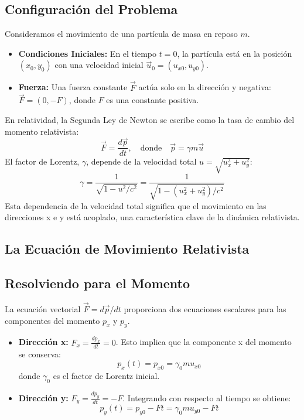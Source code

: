 \documentclass[11pt,a4paper]{article}
\begin{document}
\subsection{Configuración del Problema}
Consideramos el movimiento de una partícula de masa en reposo $m$.
\begin{itemize}
    \item \textbf{Condiciones Iniciales:} En el tiempo $t=0$, la partícula está en la posición $(x_0, y_0)$ con una velocidad inicial $\vec{u}_0 = (u_{x0}, u_{y0})$.
    \item \textbf{Fuerza:} Una fuerza constante $\vec{F}$ actúa solo en la dirección y negativa: $\vec{F} = (0, -F)$, donde $F$ es una constante positiva.
\end{itemize}
En relatividad, la Segunda Ley de Newton se escribe como la tasa de cambio del momento relativista:
\[ \vec{F} = \frac{d\vec{p}}{dt}, \quad \text{donde} \quad \vec{p} = \gamma m \vec{u} \]
El factor de Lorentz, $\gamma$, depende de la velocidad total $u = \sqrt{u_x^2 + u_y^2}$:
\[ \gamma = \frac{1}{\sqrt{1 - u^2/c^2}} = \frac{1}{\sqrt{1 - (u_x^2 + u_y^2)/c^2}} \]
Esta dependencia de la velocidad total significa que el movimiento en las direcciones x e y está acoplado, una característica clave de la dinámica relativista.

\subsection{La Ecuación de Movimiento Relativista}

\subsection{Resolviendo para el Momento}
La ecuación vectorial $\vec{F} = d\vec{p}/dt$ proporciona dos ecuaciones escalares para las componentes del momento $p_x$ y $p_y$.
\begin{itemize}
    \item \textbf{Dirección x:} $F_x = \frac{dp_x}{dt} = 0$. Esto implica que la componente x del momento se conserva:
    \[ p_x(t) = p_{x0} = \gamma_0 m u_{x0} \]
    donde $\gamma_0$ es el factor de Lorentz inicial.
    \item \textbf{Dirección y:} $F_y = \frac{dp_y}{dt} = -F$. Integrando con respecto al tiempo se obtiene:
    \[ p_y(t) = p_{y0} - Ft = \gamma_0 m u_{y0} - Ft \]
\end{itemize}
\end{document}
